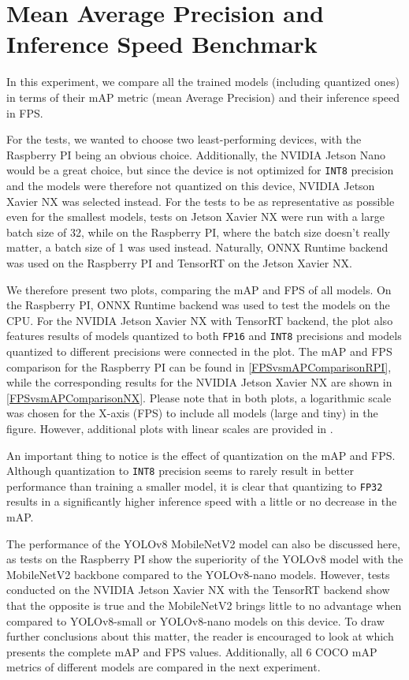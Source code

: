 \section{Mean Average Precision and Inference Speed Benchmark}
\label{FPSvsmAPComparison}

In this experiment, we compare all the trained models (including quantized ones)
in terms of their mAP metric (mean Average Precision) and their inference speed in FPS.

For the tests, we wanted to choose two least-performing devices, with the
Raspberry PI being an obvious choice. Additionally, the NVIDIA Jetson Nano would
be a great choice, but since the device is not optimized for \texttt{INT8}
precision and the models were therefore not quantized on this device, NVIDIA
Jetson Xavier NX was selected instead. For the tests to be as representative as
possible even for the smallest models, tests on Jetson Xavier NX were run with a
large batch size of 32, while on the Raspberry PI, where the batch size doesn't
really matter, a batch size of 1 was used instead. Naturally, ONNX Runtime
backend was used on the Raspberry PI and TensorRT on the Jetson Xavier NX.

We therefore present two plots, comparing the mAP and FPS of all models. On the
Raspberry PI, ONNX Runtime backend was used to test the models on the CPU. For
the NVIDIA Jetson Xavier NX with TensorRT backend, the plot also features
results of models quantized to both \texttt{FP16} and \texttt{INT8} precisions
and models quantized to different precisions were connected in the plot.
The mAP and FPS comparison for the Raspberry PI can be found in
\autoref{FPSvsmAPComparisonRPI}, while the corresponding results for the NVIDIA
Jetson Xavier NX are shown in \autoref{FPSvsmAPComparisonNX}. Please note that
in both plots, a logarithmic scale was chosen for the X-axis (FPS) to include
all models (large and tiny) in the figure. However, additional plots with linear
scales are provided in .

An important thing to notice is the effect of quantization on the mAP and FPS.
Although quantization to \texttt{INT8} precision seems to rarely result in
better performance than training a smaller model, it is clear that quantizing to
\texttt{FP32} results in a significantly higher inference speed with a little or
no decrease in the mAP.

The performance of the YOLOv8 MobileNetV2 model can also be discussed here, as
tests on the Raspberry PI show the superiority of the YOLOv8 model with the
MobileNetV2 backbone compared to the YOLOv8-nano models. However, tests
conducted on the NVIDIA Jetson Xavier NX with the TensorRT backend show that the
opposite is true and the MobileNetV2 brings little to no advantage when compared
to YOLOv8-small or YOLOv8-nano models on this device. To draw further
conclusions about this matter, the reader is encouraged to look at
 which presents the complete mAP and FPS values. Additionally,
all 6 COCO mAP metrics of different models are compared in the next experiment.

